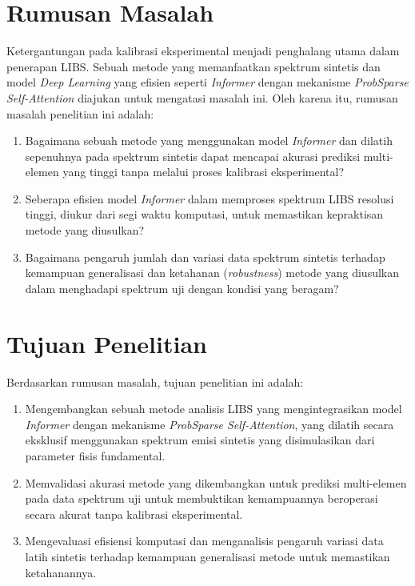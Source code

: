 \section{Rumusan Masalah}
\par Ketergantungan pada kalibrasi eksperimental menjadi penghalang utama dalam penerapan LIBS. Sebuah metode yang memanfaatkan spektrum sintetis dan model \textit{Deep Learning} yang efisien seperti \textit{Informer} dengan mekanisme \textit{ProbSparse Self-Attention} diajukan untuk mengatasi masalah ini. Oleh karena itu, rumusan masalah penelitian ini adalah:
\begin{enumerate}
    \item Bagaimana sebuah metode yang menggunakan model \textit{Informer} dan dilatih sepenuhnya pada spektrum sintetis dapat mencapai akurasi prediksi multi-elemen yang tinggi tanpa melalui proses kalibrasi eksperimental?
    \item Seberapa efisien model \textit{Informer} dalam memproses spektrum LIBS resolusi tinggi, diukur dari segi waktu komputasi, untuk memastikan kepraktisan metode yang diusulkan?
    \item Bagaimana pengaruh jumlah dan variasi data spektrum sintetis terhadap kemampuan generalisasi dan ketahanan (\textit{robustness}) metode yang diusulkan dalam menghadapi spektrum uji dengan kondisi yang beragam?
\end{enumerate}

\section{Tujuan Penelitian}
Berdasarkan rumusan masalah, tujuan penelitian ini adalah:
\begin{enumerate}
    \item Mengembangkan sebuah metode analisis LIBS yang mengintegrasikan model \textit{Informer} dengan mekanisme \textit{ProbSparse Self-Attention}, yang dilatih secara eksklusif menggunakan spektrum emisi sintetis yang disimulasikan dari parameter fisis fundamental.
    \item Memvalidasi akurasi metode yang dikembangkan untuk prediksi multi-elemen pada data spektrum uji untuk membuktikan kemampuannya beroperasi secara akurat tanpa kalibrasi eksperimental.
    \item Mengevaluasi efisiensi komputasi dan menganalisis pengaruh variasi data latih sintetis terhadap kemampuan generalisasi metode untuk memastikan ketahanannya.
\end{enumerate}

